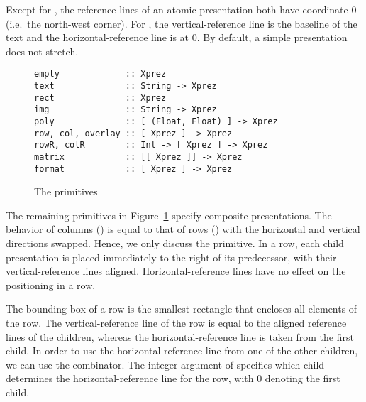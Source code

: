 Except for , the reference lines of an atomic presentation both have coordinate 0 (i.e.\ the north-west corner). For ,  the vertical-reference line is the baseline of the text and the horizontal-reference line is at 0. By default, a  simple presentation does not stretch.

\begin{figure}
\begin{small}
\begin{center}
\begin{small}
\begin{verbatim}
empty             :: Xprez
text              :: String -> Xprez             
rect              :: Xprez                       
img               :: String -> Xprez             
poly              :: [ (Float, Float) ] -> Xprez 
row, col, overlay :: [ Xprez ] -> Xprez          
rowR, colR        :: Int -> [ Xprez ] -> Xprez   
matrix            :: [[ Xprez ]] -> Xprez
format            :: [ Xprez ] -> Xprez
\end{verbatim}
\end{small}
\caption{The {\Xprez} primitives} \label{xprezprim} 
\end{center}
\end{small}
\end{figure}


The remaining primitives in Figure~\ref{xprezprim} specify composite presentations. The behavior of columns () is equal to that of rows () with the horizontal and vertical directions swapped. Hence, we only discuss the  primitive. In a row, each child presentation is placed immediately to the right of its predecessor, with their vertical-reference lines aligned. Horizontal-reference lines have no effect on the positioning in a row.

\begin{center}
\end{center}

The bounding box of a row is the smallest rectangle that encloses all elements of the row. The vertical-reference line of the row is equal to the aligned reference lines of the children, whereas the horizontal-reference line is taken from the first child. In order to use the horizontal-reference line from one of the other children, we can use the  combinator. The integer argument of  specifies which child determines the horizontal-reference line for the row, with 0 denoting the first child. 

